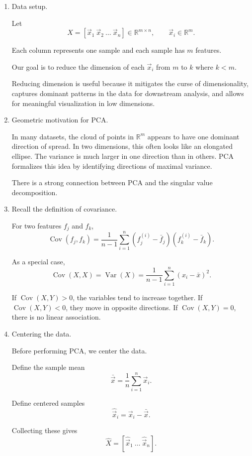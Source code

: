 \documentclass{article}
\begin{document}
\begin{enumerate}

\item Data setup.

Let
\[
X = [\vec{x}_1 \ \vec{x}_2 \ \dots \ \vec{x}_n] \in \mathbb{R}^{m \times n},
\qquad 
\vec{x}_i \in \mathbb{R}^m.
\]

Each column represents one sample and each sample has $m$ features.

Our goal is to reduce the dimension of each $\vec{x}_i$ from $m$ to $k$ where $k < m$.

Reducing dimension is useful because it mitigates the curse of dimensionality, captures dominant patterns in the data for downstream analysis, and allows for meaningful visualization in low dimensions.

\item Geometric motivation for PCA.

In many datasets, the cloud of points in $\mathbb{R}^m$ appears to have one dominant direction of spread. In two dimensions, this often looks like an elongated ellipse. The variance is much larger in one direction than in others. PCA formalizes this idea by identifying directions of maximal variance.

There is a strong connection between PCA and the singular value decomposition.

\item Recall the definition of covariance.

For two features $f_j$ and $f_k$,
\[
\operatorname{Cov}(f_j, f_k)
=
\frac{1}{n-1}
\sum_{i=1}^{n}
(f_j^{(i)} - \bar f_j)
(f_k^{(i)} - \bar f_k).
\]

As a special case,
\[
\operatorname{Cov}(X,X) = \operatorname{Var}(X)
=
\frac{1}{n-1}
\sum_{i=1}^{n} (x_i - \bar x)^2.
\]

If $\operatorname{Cov}(X,Y) > 0$, the variables tend to increase together.  
If $\operatorname{Cov}(X,Y) < 0$, they move in opposite directions.  
If $\operatorname{Cov}(X,Y) = 0$, there is no linear association.

\item Centering the data.

Before performing PCA, we center the data.

Define the sample mean
\[
\bar{\vec{x}}
=
\frac{1}{n}
\sum_{i=1}^{n}
\vec{x}_i.
\]

Define centered samples
\[
\hat{\vec{x}}_i
=
\vec{x}_i - \bar{\vec{x}}.
\]

Collecting these gives
\[
\hat{X}
=
[\hat{\vec{x}}_1 \ \dots \ \hat{\vec{x}}_n].
\]


\end{enumerate}
\end{document}
